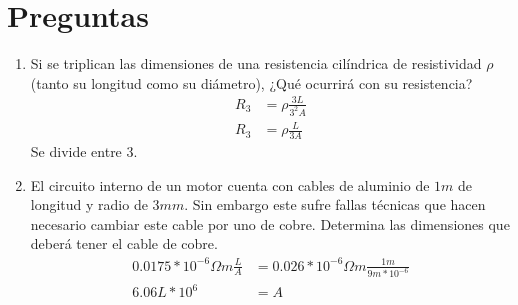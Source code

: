 \documentclass[../main.tex]{subfiles}
\begin{document}
\section{Preguntas}%
\label{sec:preguntas}

\thispagestyle{fancy}

\begin{enumerate}
	\item Si se triplican las dimensiones de una resistencia cilíndrica de
		resistividad $\rho$ (tanto su longitud como su diámetro),
		¿Qué ocurrirá con su resistencia?
		\begin{align*}
			R_3 &= \rho \frac{3L}{3^2A}\\
			R_3 &= \rho \frac{L}{3A}
		\end{align*}
		Se divide entre 3.
	\item El circuito interno de un motor cuenta con cables de aluminio de
		$1m$ de longitud y radio de $3mm$.
		Sin embargo este sufre fallas técnicas que hacen necesario cambiar este
		cable por uno de cobre.
		Determina las dimensiones que deberá tener el cable de cobre.
		\begin{align*}
			0.0175*10^{-6}\Omega m
			\frac{L}{A}
			&= 0.026*10^{-6}\Omega m \frac{1m}{9m*10^{-6}}\\
			6.06L *10^{6}&= A
		\end{align*}
\end{enumerate}
\end{document}

